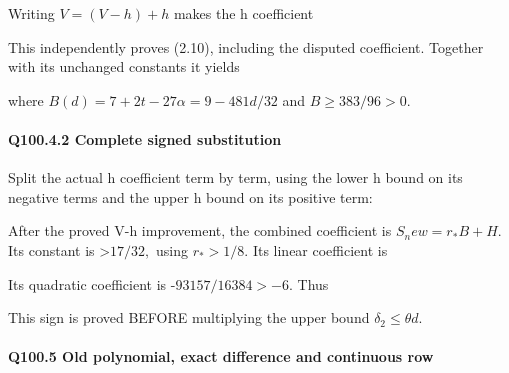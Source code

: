 
Writing \(V=(V-h)+h\) makes the h coefficient


This independently proves (2.10), including the disputed
coefficient. Together with its unchanged constants it yields


where \(B(d)=7+2t-27\alpha=9-481d/32\) and \(B\ge 383/96>0.\)


\paragraph{Q100.4.2 Complete signed substitution}

Split the actual h coefficient
term by term, using the lower h bound on its negative terms and the
upper h bound on its positive term:


After the proved V-h improvement, the combined coefficient is
\(S_new=r_*B+H.\) Its constant is >\(17/32,\allowbreak \) using \(r_*>1/8.\)
Its linear coefficient is


Its quadratic coefficient is -\(93157/16384>-6.\) Thus


This sign is proved BEFORE multiplying the upper bound \(\delta_2\le\theta d\).
\paragraph{Q100.5 Old polynomial, exact difference and continuous row}

